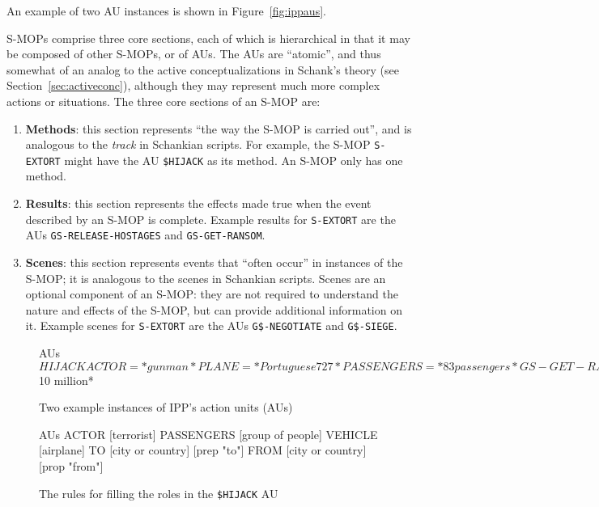 An example of two AU instances is shown in Figure~\vref{fig:ippaus}.

S-MOPs comprise three core sections, each of which is hierarchical in that it may be composed of other S-MOPs, or of AUs. The AUs are ``atomic'', and thus somewhat of an analog to the active conceptualizations in Schank's theory (see Section~\vref{sec:activeconc}), although they may represent much more complex actions or situations. The three core sections of an S-MOP are:

\begin{enumerate}
    \item \textbf{Methods}: this section represents ``the way the S-MOP is carried out'', and is analogous to the \textit{track} in Schankian scripts. For example, the S-MOP \texttt{S-EXTORT} might have the AU \texttt{\$HIJACK} as its method. An S-MOP only has one method.
    
    \item \textbf{Results}: this section represents the effects made true when the event described by an S-MOP is complete. Example results for \texttt{S-EXTORT} are the AUs \texttt{GS-RELEASE-HOSTAGES} and \texttt{GS-GET-RANSOM}.
    
    \item \textbf{Scenes}: this section represents events that ``often occur'' in instances of the S-MOP; it is analogous to the scenes in Schankian scripts. Scenes are an optional component of an S-MOP: they are not required to understand the nature and effects of the S-MOP, but can provide additional information on it. Example scenes for \texttt{S-EXTORT} are the AUs \texttt{G\$-NEGOTIATE} and \texttt{G\$-SIEGE}.
\end{enumerate}


\begin{figure}
    \centering
  \begin{SaveVerbatim}{AUs}
$HIJACK
    ACTOR       = *gunman*
    PLANE       = *Portuguese 727*
    PASSENGERS  = *83 passengers*

GS-GET-RANSOM
    ACTOR       = *gunman*
    AMOUNT      = *$10 million*
\end{SaveVerbatim}
  \setlength{\fboxsep}{5mm}
    \caption{Two example instances of IPP's action units (AUs)}
    \label{fig:ippaus}
\end{figure}

\begin{figure}
    \centering
  \begin{SaveVerbatim}{AUs}
ACTOR       [terrorist]
PASSENGERS  [group of people]
VEHICLE     [airplane]
TO          [city or country] [prep "to"]
FROM        [city or country] [prop "from"]
\end{SaveVerbatim}
  \setlength{\fboxsep}{5mm}
    \caption{The rules for filling the roles in the \texttt{\$HIJACK} AU}
    \label{fig:ippaurolefill}
\end{figure}

